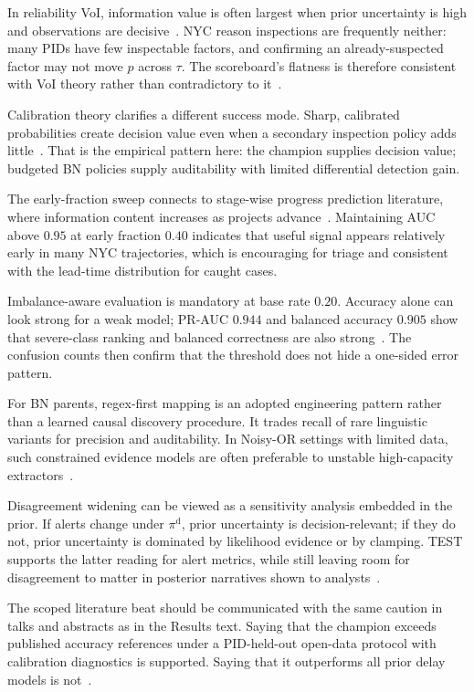 In reliability VoI, information value is often largest when prior uncertainty is high and observations are decisive~\cite{Memarzadeh2016,Malings2016,Yuan2021}. NYC reason inspections are frequently neither: many PIDs have few inspectable factors, and confirming an already-suspected factor may not move $p$ across $\tau$. The scoreboard's flatness is therefore consistent with VoI theory rather than contradictory to it~\cite{Song2021,Fauriat2020}.

Calibration theory clarifies a different success mode. Sharp, calibrated probabilities create decision value even when a secondary inspection policy adds little~\cite{Gneiting2007,GneitingRaftery2007,Brier1950}. That is the empirical pattern here: the champion supplies decision value; budgeted BN policies supply auditability with limited differential detection gain.

The early-fraction sweep connects to stage-wise progress prediction literature, where information content increases as projects advance~\cite{Tagharobi2025}. Maintaining AUC above $0.95$ at early fraction $0.40$ indicates that useful signal appears relatively early in many NYC trajectories, which is encouraging for triage and consistent with the lead-time distribution for caught cases.

Imbalance-aware evaluation is mandatory at base rate $0.20$. Accuracy alone can look strong for a weak model; PR-AUC $0.944$ and balanced accuracy $0.905$ show that severe-class ranking and balanced correctness are also strong~\cite{Saito2015,Hand2009,Egwim2021}. The confusion counts then confirm that the threshold does not hide a one-sided error pattern.

For BN parents, regex-first mapping is an adopted engineering pattern rather than a learned causal discovery procedure. It trades recall of rare linguistic variants for precision and auditability. In Noisy-OR settings with limited data, such constrained evidence models are often preferable to unstable high-capacity extractors~\cite{Onisko2001,Heckerman1996}.

Disagreement widening can be viewed as a sensitivity analysis embedded in the prior. If alerts change under $\pi^{\mathrm{d}}$, prior uncertainty is decision-relevant; if they do not, prior uncertainty is dominated by likelihood evidence or by clamping. TEST supports the latter reading for alert metrics, while still leaving room for disagreement to matter in posterior narratives shown to analysts~\cite{Khodabakhshian2025}.

The scoped literature beat should be communicated with the same caution in talks and abstracts as in the Results text. Saying that the champion exceeds published accuracy references under a PID-held-out open-data protocol with calibration diagnostics is supported. Saying that it outperforms all prior delay models is not~\cite{Khodabakhshian2025,Tagharobi2025,Egwim2021}.

